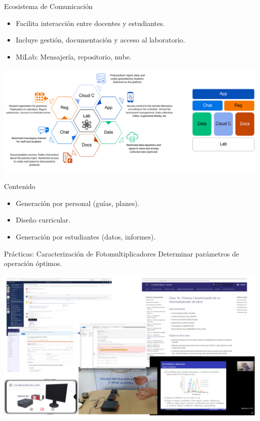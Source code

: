 \begin{frame}{Ecosistema de Comunicación}
\begin{itemize}
    \item Facilita interacción entre docentes y estudiantes.
    \item Incluye gestión, documentación y acceso al laboratorio.
    \item MiLab: Mensajería, repositorio, nube.
\end{itemize}
\begin{center}
\includegraphics[scale=0.15]{imagenes/remotelabs.png}
\end{center}
\end{frame}

\begin{frame}{Contenido}
\begin{itemize}
    \item Generación por personal (guías, planes).
    \item Diseño curricular.
    \item Generación por estudiantes (datos, informes).
\end{itemize}
\end{frame}

\begin{frame}{Prácticas: Caracterización de Fotomultiplicadores}
Determinar parámetros de operación óptimos.

\begin{center}
\includegraphics[scale=0.6]{imagenes/SiPM-WF.png}
\end{center}
\end{frame}

